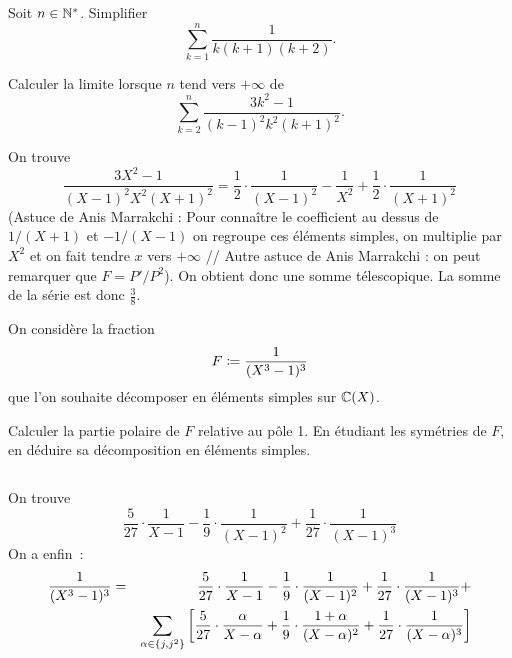 \documentclass{magnolia}
\begin{document}
Soit $n\in{\mathbb{N}^*}$. Simplifier
\[\sum_{k=1}^n \frac{1}{k(k+1)(k+2)}.\]

Calculer la limite lorsque $n$ tend vers $+\infty$ de
\[\sum_{k=2}^n \frac{3k^2-1}{(k-1)^2k^2(k+1)^2}.\]
\begin{sol}
On trouve
\[\frac{3X^2-1}{(X-1)^2X^2(X+1)^2}=\frac{1}{2}\cdot\frac{1}{(X-1)^2}
  -\frac{1}{X^2}+\frac{1}{2}\cdot\frac{1}{(X+1)^2}\]
(Astuce de Anis Marrakchi : Pour connaître le coefficient au dessus de
$1/(X+1)$ et $-1/(X-1)$ on regroupe ces éléments simples, on multiplie par
$X^2$ et on fait tendre $x$ vers $+\infty$ // Autre astuce de Anis Marrakchi :
on peut remarquer que $F=P'/P^2$).
On obtient donc une somme télescopique. La somme de la série est donc
$\frac{3}{8}$.
\end{sol}

On considère la fraction
\[F\coloneqq\frac{1}{(X^3-1)^3}\]
que l'on souhaite décomposer en éléments simples sur $\fracC$.
\begin{questions}
\question Calculer la partie polaire de $F$ relative au pôle 1.
\question En étudiant les symétries de $F$, en déduire sa décomposition en
  éléments simples.
\end{questions}
\begin{sol}
$\quad$
\begin{questions}
\question On trouve
  \[\frac{5}{27}\cdot\frac{1}{X-1}-\frac{1}{9}\cdot\frac{1}{(X-1)^2}
    +\frac{1}{27}\cdot\frac{1}{(X-1)^3}\]
\question On a enfin~:
  \begin{eqnarray*}
  \frac{1}{(X^3-1)^3}&=&
    \frac{5}{27}\cdot\frac{1}{X-1}-\frac{1}{9}\cdot\frac{1}{(X-1)^2}
    +\frac{1}{27}\cdot\frac{1}{(X-1)^3}+\\
    &&\sum_{\alpha\in\left\{j,j^2\right\}}\left[
    \frac{5}{27}\cdot\frac{\alpha}{X-\alpha}+\frac{1}{9}\cdot\frac{1+\alpha}{(X-\alpha)^2}
    +\frac{1}{27}\cdot\frac{1}{(X-\alpha)^3}\right]
  \end{eqnarray*}
\end{questions}
\end{sol}
\end{document}
